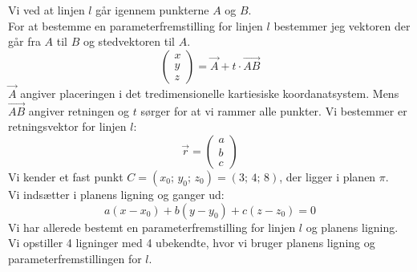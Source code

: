 \begin{tcolorbox}[title=Opgave 4,
    colback=blue!1!white,
    colframe=black,
    colbacktitle=blue!25!white,
    coltitle=red!25!black,
    fonttitle=\bfseries,
    subtitle style={boxrule=0.4pt,
    colback=blue!7!white} ]
    Vi ved at linjen \(l\) går igennem punkterne \(A\) og \(B\).\\
    For at bestemme en parameterfremstilling for linjen \(l\) bestemmer jeg vektoren der går fra \(A\) til \(B\) og stedvektoren til \(A\).\\
    \[\begin{pmatrix} x\\y\\z \end{pmatrix}=\overrightarrow{A}+t\cdot \overrightarrow{AB}\]
    \(\overrightarrow{A}\) angiver placeringen i det tredimensionelle kartiesiske koordanatsystem. Mens \(\overrightarrow{AB}\) angiver retningen og \(t\) sørger for at vi rammer alle punkter.
        Vi bestemmer er retningsvektor for linjen \(l\):
        \[\overrightarrow{r}=\begin{pmatrix} a \\ b \\ c \end{pmatrix}\]
        Vi kender et fast punkt \(C=(x_0;\, y_0;\, z_0)=(3;\,4;\,8)\), der ligger i planen \(\pi\).\\
        Vi indsætter i planens ligning og ganger ud:
        \[a(x-x_0)+b(y-y_0)+c(z-z_0)=0\]
    Vi har allerede bestemt en parameterfremstilling for linjen \(l\) og planens ligning.\\
    Vi opstiller 4 ligninger med 4 ubekendte, hvor vi bruger planens ligning og parameterfremstillingen for \(l\).
\end{tcolorbox}